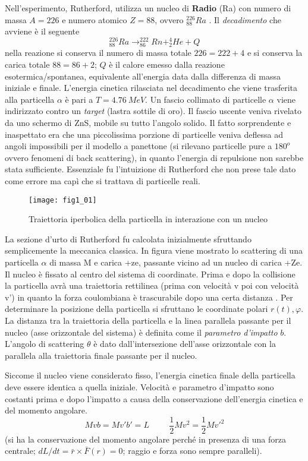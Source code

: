 Nell'esperimento, Rutherford, utilizza un nucleo di \textbf{Radio} (Ra) con numero di massa $A=226$ e numero atomico $Z=88$, ovvero $^{226}_{88} Ra$ .
Il \emph{decadimento} che avviene è il seguente
\begin{equation}
^{226}_{88} Ra \longrightarrow ^{222}_{86}Rn + ^{4}_{2}He + Q
\end{equation}
nella reazione si conserva il numero di massa totale $ 226 = 222 + 4 $ e si conserva la carica totale $ 88 = 86 + 2 $;
$Q$ è il calore emesso dalla reazione esotermica/spontanea, equivalente all'energia data dalla differenza di massa iniziale e finale. 
L'energia cinetica rilasciata nel decadimento che viene trasferita alla particella $\alpha$ è pari a $T = \SI{4.76}{MeV}$.
Un fascio collimato di particelle $\alpha$ viene indirizzato contro un \emph{target} (lastra sottile di oro).
Il fascio uscente veniva rivelato da uno schermo di ZnS, mobile su tutto l'angolo solido.
Il fatto sorprendente e inaspettato era che una piccolissima porzione di particelle veniva deflessa ad angoli impossibili per il modello a panettone (si rilevano particelle pure a $180^o$ ovvero fenomeni di back scattering), in quanto l'energia di repulsione non sarebbe stata sufficiente.
Essenziale fu l'intuizione di Rutherford che non prese tale dato come errore ma capì che si trattava di particelle reali.
\begin{figure}[h]
\centering
\texttt{[image: fig1\_01]}
\caption{Traiettoria iperbolica della particella in interazione con un nucleo}
\label{fig:1.1}
\end{figure}
La sezione d'urto di Rutherford fu calcolata inizialmente sfruttando semplicemente la meccanica classica.
In figura viene mostrato lo scattering di una particella $\alpha$ di massa M e carica +ze, passante vicino ad un nucleo di carica +Ze.
Il nucleo è fissato al centro del sistema di coordinate.
Prima e dopo la collisione la particella avrà una traiettoria rettilinea (prima con velocità v poi con velocità v') in quanto la forza coulombiana è trascurabile dopo una certa distanza .
Per determinare la posizione della particella si sfruttano le coordinate polari $r(t), \varphi$. 
La distanza tra la traiettoria della particella e la linea parallela passante per il nucleo (asse orizzontale del sistema) è definita come il \emph{parametro d'impatto} $b$.
L'angolo di scattering $\theta$ è dato dall'intersezione dell'asse orizzontale con la parallela alla traiettoria finale passante per il nucleo.

Siccome il nucleo viene considerato fisso, l'energia cinetica finale della particella deve essere identica a quella iniziale. 
Velocità e parametro d'impatto sono costanti prima e dopo l'impatto a causa della conservazione dell'energia cinetica e del momento angolare.
\begin{equation}
Mvb=Mv'b'=L \hspace{1cm} \frac{1}{2}Mv^2=\frac{1}{2}Mv'^2
\end{equation}
(si ha la conservazione del momento angolare perché in presenza di una forza centrale; $dL/dt=\bar r \times \bar F (r)=0$; raggio e forza sono sempre paralleli).

